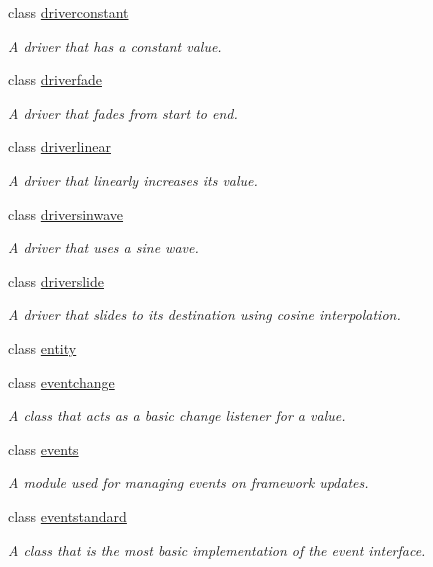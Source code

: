 \begin{DoxyCompactItemize}
class \hyperlink{classflounder_1_1driverconstant}{driverconstant}
\begin{DoxyCompactList}\small\item\em A driver that has a constant value. \end{DoxyCompactList}\item 
class \hyperlink{classflounder_1_1driverfade}{driverfade}
\begin{DoxyCompactList}\small\item\em A driver that fades from start to end. \end{DoxyCompactList}\item 
class \hyperlink{classflounder_1_1driverlinear}{driverlinear}
\begin{DoxyCompactList}\small\item\em A driver that linearly increases its value. \end{DoxyCompactList}\item 
class \hyperlink{classflounder_1_1driversinwave}{driversinwave}
\begin{DoxyCompactList}\small\item\em A driver that uses a sine wave. \end{DoxyCompactList}\item 
class \hyperlink{classflounder_1_1driverslide}{driverslide}
\begin{DoxyCompactList}\small\item\em A driver that slides to its destination using cosine interpolation. \end{DoxyCompactList}\item 
class \hyperlink{classflounder_1_1entity}{entity}
\item 
class \hyperlink{classflounder_1_1eventchange}{eventchange}
\begin{DoxyCompactList}\small\item\em A class that acts as a basic change listener for a value. \end{DoxyCompactList}\item 
class \hyperlink{classflounder_1_1events}{events}
\begin{DoxyCompactList}\small\item\em A module used for managing events on framework updates. \end{DoxyCompactList}\item 
class \hyperlink{classflounder_1_1eventstandard}{eventstandard}
\begin{DoxyCompactList}\small\item\em A class that is the most basic implementation of the event interface. \end{DoxyCompactList}\item 

\end{DoxyCompactItemize}
